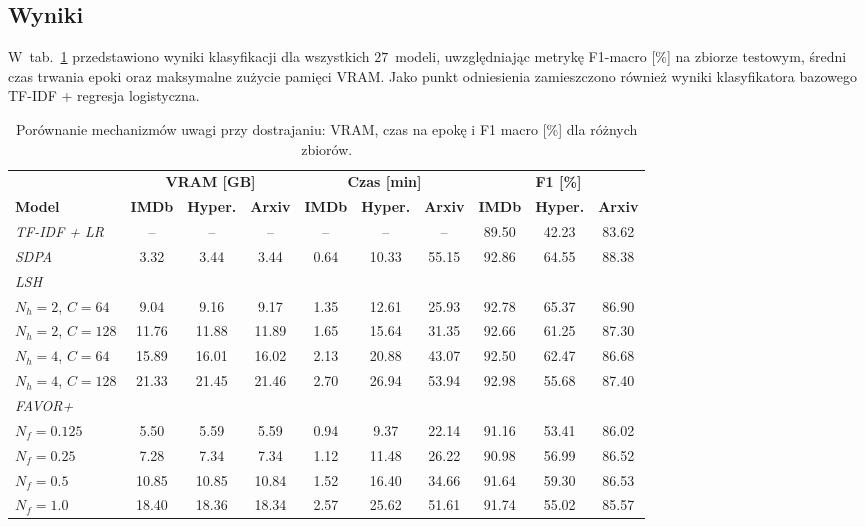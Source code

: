 \documentclass[a4paper,11pt,twoside]{report}
\theoremstyle{definition}
\begin{document}
\subsection{Wyniki}

W~tab.~\ref{tab:finetune-f1-metrics} przedstawiono wyniki klasyfikacji dla wszystkich $27$~modeli, uwzględniając metrykę F1-macro [\%] na zbiorze testowym, średni czas trwania epoki oraz maksymalne zużycie pamięci VRAM. Jako punkt odniesienia zamieszczono również wyniki klasyfikatora bazowego TF-IDF + regresja logistyczna.


\begin{table}[t!]
\centering
\caption{Porównanie mechanizmów uwagi przy dostrajaniu: VRAM, czas na epokę i F1 macro [\%] dla różnych zbiorów.}
\label{tab:finetune-f1-metrics}
\smallskip
\small
\begin{tabular}{@{}lccccccccc@{}}
\toprule
& \multicolumn{3}{c}{\textbf{\textbf{VRAM [GB]}}} & \multicolumn{3}{c}{\textbf{\textbf{Czas [min]}}} & \multicolumn{3}{c}{\textbf{\textbf{F1 [\%]}}} \\
\cmidrule(lr){2-4}
\cmidrule(lr){5-7}
\cmidrule(lr){8-10}
\textbf{Model} & \textbf{IMDb} & \textbf{Hyper.} & \textbf{Arxiv} & \textbf{IMDb} & \textbf{Hyper.} & \textbf{Arxiv} & \textbf{IMDb} & \textbf{Hyper.} & \textbf{Arxiv} \\
\midrule
\textit{TF-IDF + LR} & -- & -- & -- & -- & -- & -- & 89.50 & 42.23 & 83.62 \\
\midrule
\textit{SDPA} & 3.32 & 3.44 & 3.44 & 0.64 & 10.33 & 55.15 & 92.86 & 64.55 & 88.38 \\
\midrule
\multicolumn{10}{l}{\textit{LSH}} \\
$N_h{=}2$, $C{=}64$ & 9.04 & 9.16 & 9.17 & 1.35 & 12.61 & 25.93 & 92.78 & 65.37 & 86.90 \\
$N_h{=}2$, $C{=}128$ & 11.76 & 11.88 & 11.89 & 1.65 & 15.64 & 31.35 & 92.66 & 61.25 & 87.30 \\
$N_h{=}4$, $C{=}64$ & 15.89 & 16.01 & 16.02 & 2.13 & 20.88 & 43.07 & 92.50 & 62.47 & 86.68 \\
$N_h{=}4$, $C{=}128$ & 21.33 & 21.45 & 21.46 & 2.70 & 26.94 & 53.94 & 92.98 & 55.68 & 87.40 \\
\midrule
\multicolumn{10}{l}{\textit{FAVOR+}} \\
$N_f{=}0.125$ & 5.50 & 5.59 & 5.59 & 0.94 & 9.37 & 22.14 & 91.16 & 53.41 & 86.02 \\
$N_f{=}0.25$ & 7.28 & 7.34 & 7.34 & 1.12 & 11.48 & 26.22 & 90.98 & 56.99 & 86.52 \\
$N_f{=}0.5$ & 10.85 & 10.85 & 10.84 & 1.52 & 16.40 & 34.66 & 91.64 & 59.30 & 86.53 \\
$N_f{=}1.0$ & 18.40 & 18.36 & 18.34 & 2.57 & 25.62 & 51.61 & 91.74 & 55.02 & 85.57 \\
\bottomrule
\end{tabular}
\end{table}
\end{document}
